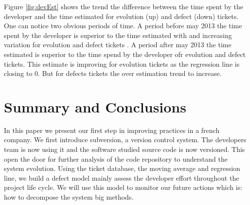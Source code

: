 \documentclass[10pt,conference]{IEEEtran}
\begin{document}
Figure \ref{fig:devEst} shows the trend  the difference between the time spent by the developer and the time estimated for evolution (up) and defect (down) tickets.
One can notice two obvious periods of time. 
 A period before may 2013 the time spent by the developer is superior to the time estimated with and increasing variation for evolution and defect tickets . 
 A period after may 2013  the time estimated is superior to the time spend by the developer ofr evolution and defect tickets.  
 This estimate  is improving for evolution tickets as the regression line is closing to 0.
But for defects tickets  the over estimation trend to increase.



\section{Summary and Conclusions}
\label{sec:conclusion}

In this paper we present our first step in  improving practices in a french company. We first introduce subversion, a version control system.
The developers team is now using it and the software studied source code is now versioned.
This open the door for further analysis of the code repository to understand the system evolution. 
Using the ticket database, the moving average and regression line, we build a defect model mainly assess the developer effort throughout the project life cycle. We will use this model to monitor our future actions which is: how to decompose the system big methods.

%


\vspace{12pt}
\end{document}
